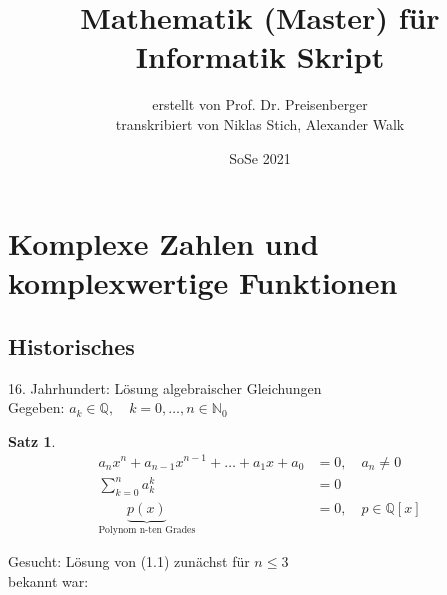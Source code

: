 \documentclass{article}
\title{Mathematik (Master) für Informatik Skript}
\date{SoSe 2021}
\author{erstellt von Prof. Dr. Preisenberger\\ transkribiert von Niklas Stich, Alexander Walk}
\newtheorem{theorem}{Satz}[section]
\begin{document}
\begin{titlepage}
\maketitle
\tableofcontents
\end{titlepage}


\section{Komplexe Zahlen und komplexwertige Funktionen}
\subsection{Historisches}
16. Jahrhundert: Lösung algebraischer Gleichungen\\
Gegeben: \(a_{k}\in\mathbb{Q},\quad k=0,\dots,n\in\mathbb{N}_{0}\)
\begin{theorem}
\begin{align}
    a_{n}x^{n}+a_{n-1}x^{n-1}+\dots+a_{1}x+a_{0} &= 0, \quad a_{n}\neq 0 \\
    \sum_{k=0}^{n}a_{k}^{k} &= 0 \\
    \underbrace{p(x)}_\text{Polynom n-ten Grades}&=0, \quad p \in \mathbb{Q}[x]
\end{align}
\end{theorem}
Gesucht: Lösung von (1.1) zunächst für $n \leq 3$\\
bekannt war:
\end{document}
